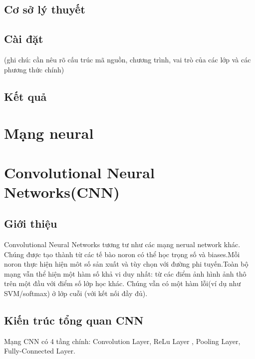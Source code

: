 \documentclass[a4paper,12pt]{report}
\begin{document}
\subsection{Cơ sở lý thuyết}
\subsection{Cài đặt}
(ghi chú: cần nêu rõ cấu trúc mã nguồn, chương trình, vai trò của các lớp và các phương thức chính)

\subsection{Kết quả}
\section{Mạng neural}
\section{Convolutional Neural Networks(CNN)}
\subsection{Giới thiệu}
Convolutional Neural Networks tương tư như các mạng nerual network khác. Chúng được tạo thành từ các tế bào noron có thể học trọng số và biases.Mỗi noron thực hiện hiện môt số sản xuất và tùy chọn với đường phi tuyến.Toàn bộ mạng vẫn thể hiện một hàm số khả vi duy nhất: từ các điểm ảnh hình ảnh thô trên một đầu với điểm số lớp học khác. Chúng vẫn có một hàm lỗi(ví dụ như SVM/softmax) ở lớp cuỗi (với kết nối đầy đủ).
\subsection{Kiến trúc tổng quan CNN}
Mạng CNN có 4 tầng chính: Convolution Layer, ReLu Layer , Pooling Layer, Fully-Connected Layer.
\end{document}
